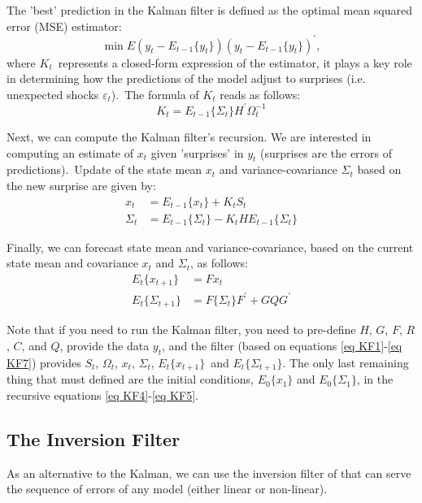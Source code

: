 \documentclass[a4paper,12pt]{article}%
\begin{document}
The 'best' prediction in the Kalman filter is defined as the optimal mean
squared error (MSE) estimator:
\[
\min E\left(  y_{t}-E_{t-1}\{y_{t}\}\right)  \left(  y_{t}-E_{t-1}%
\{y_{t}\}\right)  ^{\prime},
\]
where $K_{t}$\ represents a closed-form expression of the estimator, it plays
a key role in determining how the predictions of the model adjust to surprises
(i.e. unexpected shocks $\varepsilon_{t}$).\ The formula of $K_{t}$ reads as
follows:%
\begin{equation}
K_{t}=E_{t-1}\{\Sigma_{t}\}H^{\prime}\Omega_{t}^{-1} \label{eq KF3}%
\end{equation}


Next, we can compute the Kalman filter's recursion. We are interested in
computing an estimate of $x_{t}$ given 'surprises' in $y_{t}$ (surprises are
the errors of predictions).\ Update of the state mean $x_{t}$ and
variance-covariance $\Sigma_{t}$ based on the new surprise are given by:
\begin{align}
x_{t}  &  =E_{t-1}\{x_{t}\}+K_{t}S_{t}\label{eq KF4}\\
\Sigma_{t}  &  =E_{t-1}\{\Sigma_{t}\}-K_{t}HE_{t-1}\{\Sigma_{t}\}
\label{eq KF5}%
\end{align}


Finally, we can forecast state mean and variance-covariance, based on the
current state mean and covariance $x_{t}$ and $\Sigma_{t}$, as follows:%
\begin{align}
E_{t}\{x_{t+1}\}  &  =Fx_{t}\label{eq KF6}\\
E_{t}\{\Sigma_{t+1}\}  &  =F\{\Sigma_{t}\}F^{\prime}+GQG^{\prime}
\label{eq KF7}%
\end{align}


Note that if you need to run the Kalman filter, you need to pre-define $H$,
$G$, $F$, $R$, $C$, and $Q$, provide the data $y_{t}$, and the filter (based
on equations \autoref{eq KF1}-\autoref{eq KF7}) provides $S_{t}$, $\Omega_{t}%
$, $x_{t}$, $\Sigma_{t}$, $E_{t}\{x_{t+1}\}$\ and $E_{t}\{\Sigma_{t+1}\}$. The
only last remaining thing that must defined are the initial conditions,
$E_{0}\{x_{1}\}$ and $E_{0}\{\Sigma_{1}\}$, in the recursive equations
\ref{eq KF4}-\ref{eq KF5}.

\subsection{The Inversion Filter}

As an alternative to the Kalman, we can use the inversion filter of
\cite{kollmann2013estimating} that can serve the sequence of errors of any
model (either linear or non-linear).
\end{document}
